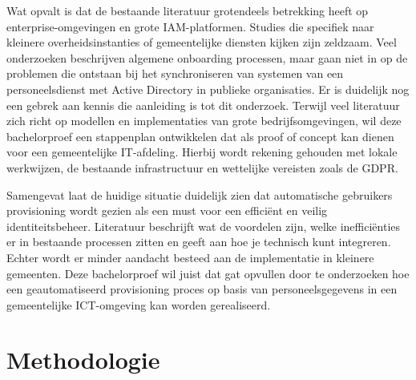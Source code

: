 Wat opvalt is dat de bestaande literatuur grotendeels betrekking heeft op enterprise-omgevingen en grote IAM-platformen. Studies die specifiek naar kleinere overheidsinstanties of gemeentelijke diensten kijken zijn zeldzaam. Veel onderzoeken beschrijven algemene onboarding processen, maar gaan niet in op de problemen die ontstaan bij het synchroniseren van systemen van een personeelsdienst met Active Directory in publieke organisaties. Er is duidelijk nog een gebrek aan kennis die aanleiding is tot dit onderzoek. Terwijl veel literatuur zich richt op modellen en implementaties van grote bedrijfsomgevingen, wil deze bachelorproef een stappenplan ontwikkelen dat als proof of concept kan dienen voor een gemeentelijke IT-afdeling. Hierbij wordt rekening gehouden met lokale werkwijzen, de bestaande infrastructuur en wettelijke vereisten zoals de GDPR.

Samengevat laat de huidige situatie duidelijk zien dat automatische gebruikers provisioning wordt gezien als een must voor een efficiënt en veilig identiteitsbeheer. Literatuur beschrijft wat de voordelen zijn, welke inefficiënties er in bestaande processen zitten en geeft aan hoe je technisch kunt integreren. Echter wordt er minder aandacht besteed aan de implementatie in kleinere gemeenten. Deze bachelorproef wil juist dat gat opvullen door te onderzoeken hoe een geautomatiseerd provisioning proces op basis van personeelsgegevens in een gemeentelijke ICT-omgeving kan worden ​‍​‌‍​‍‌gerealiseerd.

\section{Methodologie}%
\label{sec:methodologie}




